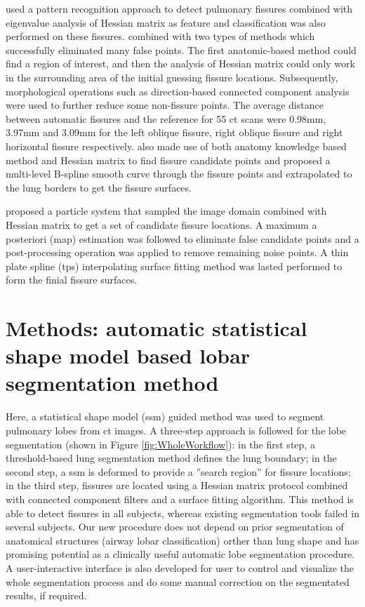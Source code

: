 \cite{ochs2007automated,van2008supervised} used a pattern recognition approach to detect pulmonary fissures combined with eigenvalue analysis of Hessian matrix as feature and classification was also performed on these fissures. \cite{lassen2011interactive,lassen2013automatic} combined with two types of methods which successfully eliminated many false points. The first anatomic-based method could find a region of interest, and then the analysis of Hessian matrix could only work in the surrounding area of the initial guessing fissure locations. Subsequently, morphological operations such as direction-based connected component analysis were used to further reduce some non-fissure points. The average distance between automatic fissures and the reference for 55 \gls{ct} scans were 0.98mm, 3.97mm and 3.09mm for the left oblique fissure, right oblique fissure and right horizontal fissure respectively. \cite{doel2012pulmonary} also made use of both anatomy knowledge based method and Hessian matrix to find fissure candidate points and proposed a multi-level B-spline smooth curve through the fissure points and extrapolated to the lung borders to get the fissure surfaces.

\cite{ross2010automatic, ross2013pulmonary} proposed a particle system that sampled the image domain combined with Hessian matrix to get a set of candidate fissure locations. A maximum a posteriori (\gls{map}) estimation was followed to eliminate false candidate points and a post-processing operation was applied to remove remaining noise points. A thin plate spline (\gls{tps}) interpolating surface fitting method was lasted performed to form the finial fissure surfaces. 
\section{Methods: automatic statistical shape model based lobar segmentation method} \label{SegmentationMethod}
Here, a statistical shape model (\gls{ssm}) guided method was used to segment pulmonary lobes from \gls{ct} images. A three-step approach is followed for the lobe segmentation (shown in Figure \ref{fig:WholeWorkflow}): in the first step, a threshold-based lung segmentation method defines the lung boundary; in the second step, a \gls{ssm} is deformed to provide a ''search region'' for fissure locations; in the third step, fissures are located using a Hessian matrix protocol combined with connected component filters and a surface fitting algorithm. This method is able to detect fissures in all subjects, whereas existing segmentation tools failed in several subjects. Our new procedure does not depend on prior segmentation of anatomical structures (airway lobar classification) orther than lung shape and has promising potential as a clinically useful automatic lobe segmentation procedure. A user-interactive interface is also developed for user to control and visualize the whole segmentation process and do some manual correction on the segmentated results, if required.

